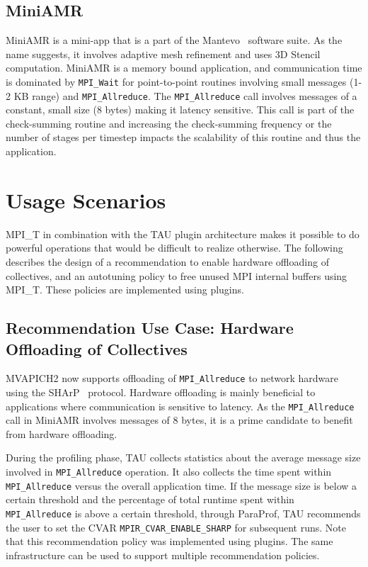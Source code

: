  \subsection{MiniAMR}

  MiniAMR is a mini-app that is a part of the Mantevo~\cite{Mantevo} software suite. As the name suggests, it involves adaptive mesh refinement and uses 3D Stencil computation. MiniAMR is a memory bound application, and communication time is dominated by \verb+MPI_Wait+ for point-to-point routines involving small messages (1-2 KB range) and \verb+MPI_Allreduce+. The \verb+MPI_Allreduce+ call involves messages of a constant, small size (8 bytes) making it latency sensitive. This call is part of the check-summing routine and increasing the check-summing frequency or the number of stages per timestep impacts the scalability of this routine and thus the application.

\section{Usage Scenarios}
MPI\_T in combination with the TAU plugin architecture makes it possible to do powerful operations that would be difficult to realize otherwise. The following describes the design of a recommendation to enable hardware offloading of collectives, and an autotuning policy to free unused MPI internal buffers using MPI\_T. These policies are implemented using plugins.
\subsection{Recommendation Use Case: Hardware Offloading of Collectives}
MVAPICH2 now supports offloading of \verb+MPI_Allreduce+ to network hardware using the SHArP~\cite{SHARP} protocol. Hardware offloading is mainly beneficial to applications where communication is sensitive to latency. As the \verb+MPI_Allreduce+ call in MiniAMR involves messages of 8 bytes, it is a prime candidate to benefit from hardware offloading. \par
During the profiling phase, TAU collects statistics about the average message size involved in \verb+MPI_Allreduce+ operation. It also collects the time spent within \verb+MPI_Allreduce+ versus the overall application time. If the message size is below a certain threshold and the percentage of total runtime spent within \verb+MPI_Allreduce+ is above a certain threshold, through ParaProf, TAU recommends the user to set the CVAR \verb+MPIR_CVAR_ENABLE_SHARP+ for subsequent runs. Note that this recommendation policy was implemented using plugins. The same infrastructure can be used to support multiple recommendation policies.
